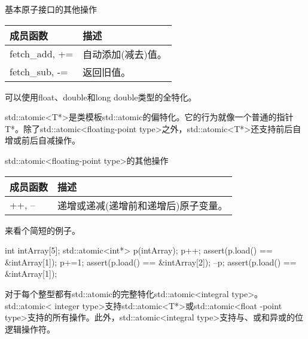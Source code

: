 \begin{center}
基本原子接口的其他操作
\end{center}

\begin{longtable}[c]{|l|l|}
\hline
\textbf{成员函数} & \textbf{描述}                  \\ \hline
\endfirsthead
%
\endhead
%
fetch\_add, +=            & 自动添加(减去)值。 \\ 
fetch\_sub, -=            & 返回旧值。                \\ \hline
\end{longtable}

可以使用float、double和long double类型的全特化。


std::atomic<T*>是类模板std::atomic的偏特化。它的行为就像一个普通的指针T*。除了std::atomic<floating-point type>之外，std::atomic<T*>还支持前后自增或前后自减操作。

\begin{center}
std::atomic<floating-point type>的其他操作
\end{center}

\begin{longtable}[c]{|l|l|}
\hline
\textbf{成员函数} & \textbf{描述}                                          \\ \hline
\endfirsthead
%
\endhead
%
++, --                    & 递增或递减(递增前和递增后)原子变量。 \\ \hline
\end{longtable}

来看个简短的例子。

\begin{cpp}
int intArray[5];
std::atomic<int*> p(intArray);
p++;
assert(p.load() == &intArray[1]);
p+=1;
assert(p.load() == &intArray[2]);
--p;
assert(p.load() == &intArray[1]);
\end{cpp}


对于每个整型都有std::atomic的完整特化std::atomic<integral type>。std::atomic< integer type>支持std::atomic<T*>或std::atomic<float -point type>支持的所有操作。此外，std::atomic<integral type>支持与、或和异或的位逻辑操作符。

